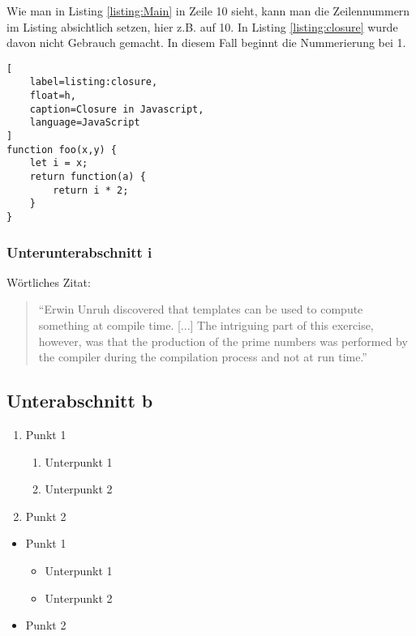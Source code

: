 Wie man in Listing \ref{listing:Main} in Zeile 10 sieht, kann man die Zeilennummern im Listing absichtlich setzen, hier z.B. auf 10. In Listing \ref{listing:closure} wurde davon nicht Gebrauch gemacht. In diesem Fall beginnt die Nummerierung bei 1.

\begin{lstlisting}[
    label=listing:closure,
	float=h,
	caption=Closure in Javascript,
	language=JavaScript
]
function foo(x,y) {
    let i = x;
    return function(a) {
        return i * 2;
    }
}
\end{lstlisting}


\subsubsection{Unterunterabschnitt i}

Wörtliches Zitat:
\begin{quote}
``Erwin Unruh discovered that templates can be used to compute
something at compile time. [...] The intriguing part of this exercise, however, was that the production of the prime numbers was performed by the compiler during the compilation process and not at run time.''

\autocite[305]{Bosch2014}
\end{quote}
\selectthesislanguage


\subsection{Unterabschnitt b}

\begin{enumerate}
	\item Punkt 1
	\begin{enumerate}
		\item Unterpunkt 1
		\item Unterpunkt 2
	\end{enumerate}
	\item Punkt 2
\end{enumerate}

\begin{itemize}
	\item Punkt 1
	\begin{itemize}
		\item Unterpunkt 1
		\item Unterpunkt 2
	\end{itemize}
	\item Punkt 2
\end{itemize}


